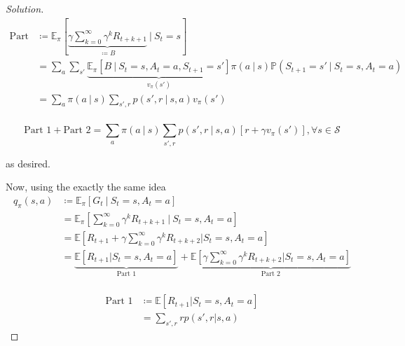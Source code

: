 \documentclass[oneside,11pt]{article}
\theoremstyle{definition}
\newcommand{\PP}{\mathbb{P}}
\newcommand{\EE}{\mathbb{E}}
\newcommand{\Scal}{\mathcal{S}}
\newcommand{\vpi}{v_{\pi}}
\newcommand{\qpi}{q_{\pi}}
\newcommand\givenbase[1][]{\:#1\lvert\:}
\let\given\givenbase
\newenvironment{solution}
{\renewcommand\qedsymbol{$\blacksquare$}\begin{proof}[Solution]} {\end{proof}}
\begin{document}
\begin{shaded}
\begin{solution}
\begin{equation*} %
\begin{split}
\text{Part 2} & \coloneqq  \EE_{\pi} \left [ \underbrace{\gamma \sum\limits_{k = 0}^{\infty} \gamma^k R_{t + k +1}}_{\coloneqq B} \given S_t = s \right ] \\
& = \sum_a \sum_{s'} \underbrace{\EE_{\pi} \left [ B \given S_t = s, A_t = a, S_{t+1} = s' \right ]}_{v_{\pi}(s')} \pi(a \given s) \PP(S_{t+1} = s' \given S_t = s, A_t = a) \\
& = \sum_a \pi(a \given s) \sum_{s',r} p(s', r \given s,a) v_{\pi}(s') \\
\end{split}
\end{equation*}

\[\text{Part 1} + \text{Part 2} =  \sum\limits_{a} \pi(a\given s)  \sum\limits_{s',r} p(s', r \given s,a) \left [ r + \gamma \vpi(s') \right ], \forall s \in \Scal \]

as desired.

Now, using the exactly the same idea
\begin{equation*} %
\begin{split}
\qpi (s,a) & \coloneqq  \EE_{\pi}\left [G_t \given S_t = s, A_t = a \right ] \\
& = \EE_{\pi} \left [ \sum\limits_{k = 0}^{\infty} \gamma^k R_{t + k +1} \given S_t = s, A_t = a \right ]\\
& = \EE \left [ R_{t+1} + \gamma \sum_{k=0}^{\infty}\gamma^k R_{t+ k +2} | S_t = s, A_t = a \right ] \\
& = \underbrace{\EE \left [ R_{t+1}  | S_t = s, A_t = a \right ]}_{\text{Part 1}}+ \underbrace{\EE \left [\gamma \sum_{k=0}^{\infty}\gamma^k R_{t+ k +2} | S_t = s, A_t = a \right ]}_{\text{Part 2}} \\
\end{split}
\end{equation*}

\begin{equation*} %
\begin{split}
\text{Part 1} & \coloneqq  \EE \left [ R_{t+1}  | S_t = s, A_t = a \right ] \\
& = \sum_{s',r} r p(s',r | s,a)
\end{split}
\end{equation*}


\end{solution}
\end{shaded}
\end{document}
